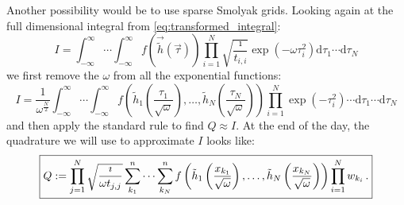 \documentclass[a4paper,10pt]{article}
\begin{document}
Another possibility would be to use sparse Smolyak grids.
Looking again at the full dimensional integral from \eqref{eq:transformed_integral}:
\begin{equation}
 I = \int_{-\infty}^\infty \cdots \int_{-\infty}^\infty
       f\left(\vec{\tilde{h}}(\vec{\tau})\right)
       \prod_{i=1}^N \sqrt{\frac{\imath}{t_{i,i}}}
                     \exp\left(-\omega \tau_i^2\right)
    \mathrm{d}\tau_1 \cdots \mathrm{d}\tau_N
\end{equation}
we first remove the $\omega$ from all the exponential functions:
\begin{equation*}
 I = \frac{1}{\omega^\frac{N}{2}}
     \int_{-\infty}^\infty \cdots \int_{-\infty}^\infty
       f\left(\tilde{h}_1\left(\frac{\tau_1}{\sqrt{\omega}}\right),
              \ldots,
              \tilde{h}_N\left(\frac{\tau_N}{\sqrt{\omega}}\right)
       \right)
       \prod_{i=1}^N \exp\left(-\tau_i^2\right) \cdots
    \mathrm{d}\tau_1 \cdots \mathrm{d}\tau_N
\end{equation*}
and then apply the standard rule to find $Q \approx I$. At the end
of the day, the quadrature we will use to approximate $I$ looks like:
\begin{equation} \label{eq:final_quadrature}
\boxed{
  Q :=
  \prod_{j=1}^N \sqrt{\frac{\imath}{\omega t_{j,j}}}
  \sum_{k_1}^n \cdots \sum_{k_N}^n
    f\left(\tilde{h}_1\left(\frac{x_{k_1}}{\sqrt{\omega}}\right),
           \ldots,
           \tilde{h}_N\left(\frac{x_{k_N}}{\sqrt{\omega}}\right)
    \right)
    \prod_{i=1}^N w_{k_i} \,.
}
\end{equation}
\end{document}
